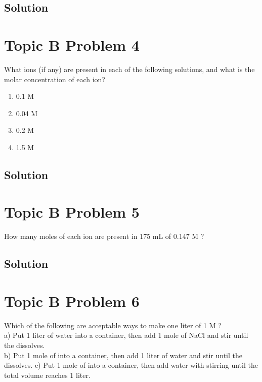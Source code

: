\documentclass[10pt]{article}
\begin{document}
        \subsection{Solution}

    \pagebreak
    \section{Topic B Problem 4}
        What ions (if any) are present in each of the following solutions, and what is the molar concentration of each ion?
        
        \begin{multicols}{2}
            \begin{enumerate}[label=\alph*)]
                \item   0.1 M 
                \item   0.04 M 
                \item   0.2 M 
                \item   1.5 M 
            \end{enumerate}
        \end{multicols}

        \subsection{Solution}

    \pagebreak
    \section{Topic B Problem 5}
        How many moles of each ion are present in 175 mL of 0.147 M ?

        \subsection{Solution}

    \pagebreak
    \section{Topic B Problem 6}
        Which of the following are acceptable ways to make one liter of 1 M ?\\
        a) Put 1 liter of water into a container, then add 1 mole of NaCl and stir until the  dissolves.\\
        b) Put 1 mole of  into a container, then add 1 liter of water and stir until the  dissolves.
        c) Put 1 mole of  into a container, then add water with stirring until the total volume reaches 1 liter.
\end{document}
